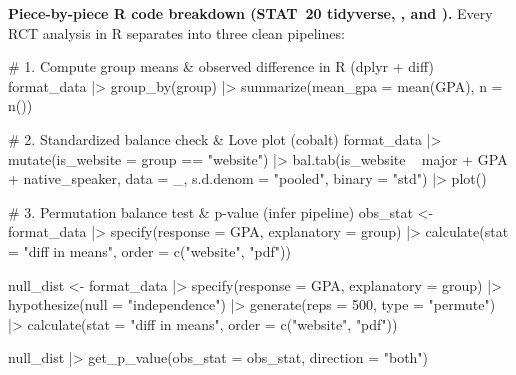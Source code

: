 \documentclass[10pt]{scrartcl}
\begin{document}
\medskip\noindent\textbf{Piece-by-piece R code breakdown (STAT~20 tidyverse, , and ).} Every RCT analysis in R separates into three clean pipelines:
\begin{rcode}
# 1. Compute group means & observed difference in R (dplyr + diff)
format_data |>
  group_by(group) |>
  summarize(mean_gpa = mean(GPA), n = n())

# 2. Standardized balance check & Love plot (cobalt)
format_data |>
  mutate(is_website = group == "website") |>
  bal.tab(is_website ~ major + GPA + native_speaker, data = _,
          s.d.denom = "pooled", binary = "std") |>
  plot()

# 3. Permutation balance test & p-value (infer pipeline)
obs_stat <- format_data |>
  specify(response = GPA, explanatory = group) |>
  calculate(stat = "diff in means", order = c("website", "pdf"))

null_dist <- format_data |>
  specify(response = GPA, explanatory = group) |>
  hypothesize(null = "independence") |>
  generate(reps = 500, type = "permute") |>
  calculate(stat = "diff in means", order = c("website", "pdf"))

null_dist |> get_p_value(obs_stat = obs_stat, direction = "both")
\end{rcode}
\end{document}
